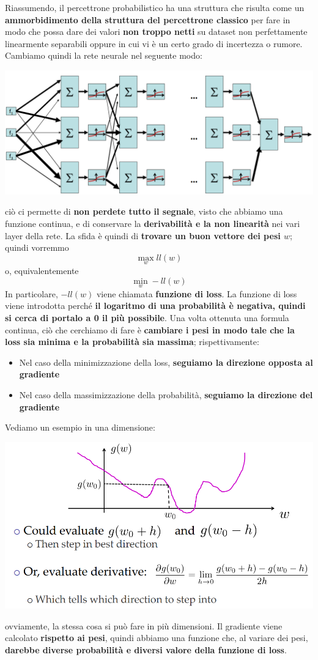 \documentclass[12pt]{article}
\begin{document}
Riassumendo, il percettrone probabilistico ha una struttura che risulta come un \textbf{ammorbidimento della struttura del percettrone classico} per fare in modo che possa dare dei valori \textbf{non troppo netti} su dataset non perfettamente linearmente separabili oppure in cui vi è un certo
grado di incertezza o rumore. Cambiamo quindi la rete neurale nel seguente modo:
\begin{center}
    \includegraphics[width =1\linewidth]{Images/115.PNG}
\end{center}
ciò ci permette di \textbf{non perdete tutto il segnale}, visto che abbiamo una funzione continua, e di conservare la \textbf{derivabilità e la non linearità} nei vari layer della rete.
La sfida è quindi di \textbf{trovare un buon vettore dei pesi $w$}; quindi vorremmo
$$\max_w ll(w)$$
o, equivalentemente
$$\min_w -ll(w)$$
In particolare, $-ll(w)$ viene chiamata \textbf{funzione di loss}. La funzione di loss viene introdotta perché \textbf{il logaritmo di una probabilità è negativa, quindi si cerca di portalo a 0 il più possibile}.
Una volta ottenuta una formula continua, ciò che cerchiamo di fare è \textbf{cambiare i pesi in modo tale che la loss sia minima e la probabilità sia massima}; rispettivamente:
\begin{itemize}
    \item Nel caso della minimizzazione della loss, \textbf{seguiamo la direzione opposta al gradiente}
    \item Nel caso della massimizzazione della probabilità, \textbf{seguiamo la direzione del gradiente}
\end{itemize}
Vediamo un esempio in una dimensione:
\begin{center}
    \includegraphics[width =0.80\linewidth]{Images/116.PNG}
\end{center}
ovviamente, la stessa cosa si può fare in più dimensioni. Il gradiente viene calcolato \textbf{rispetto ai pesi}, quindi abbiamo una funzione che, al variare dei pesi, \textbf{darebbe diverse probabilità e diversi valore della funzione di loss}.
\end{document}
